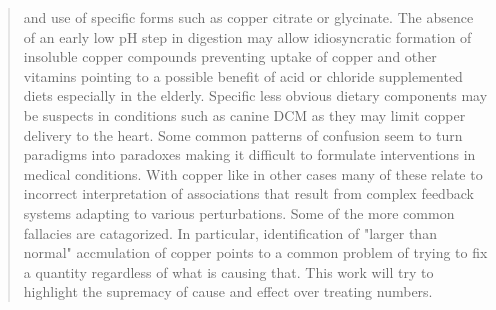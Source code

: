 \begin{abstract}
and  use of specific forms such as copper citrate or glycinate.  
The absence of an early low pH step in digestion may allow
idiosyncratic formation of insoluble copper compounds
preventing uptake of copper and other vitamins pointing
to a possible benefit of acid or chloride supplemented diets especially
in the elderly.
Specific less obvious dietary components may %
be suspects in conditions such as canine DCM 
as they may limit copper delivery to the heart. 
Some common patterns of confusion seem to turn paradigms
into paradoxes making it difficult to formulate interventions
in medical conditions. With copper like in other cases many
of these relate to incorrect interpretation of associations
that result from complex feedback systems adapting to various
perturbations. Some of the more common fallacies are catagorized.
In particular, identification of "larger than normal" accmulation
of copper points to a common problem of trying to fix a quantity
regardless of what is causing that. This work will try to highlight
the supremacy of cause and effect over treating numbers. 




\end{abstract}
